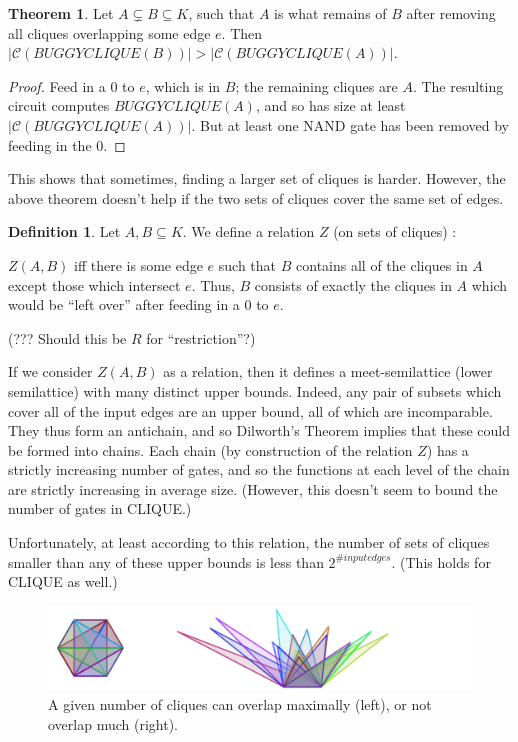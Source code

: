 \documentclass[12pt]{article}
\theoremstyle{definition}
\newtheorem{thm}{Theorem}[section]
\newtheorem{defn}{Definition}[section]
\newcommand{\bigC}[0]{\mathcal{C}}
\begin{document}
\begin{thm}
\label{edgeZonking}
Let $A \subsetneq B \subseteq K$, such that $A$ is what remains
of $B$ after removing all cliques overlapping some edge $e$.
Then $|\bigC(BUGGYCLIQUE(B))| > |\bigC(BUGGYCLIQUE(A))|$.
\end{thm}
\begin{proof}
Feed in a 0 to $e$, which is in $B$; the remaining cliques are $A$.
The resulting
circuit computes $BUGGYCLIQUE(A)$, and so has size
at least $|\bigC(BUGGYCLIQUE(A))|$. But at least one
NAND gate has been removed by feeding in the 0.
\end{proof}

This shows that sometimes, finding a larger set of cliques is
harder. However, the above theorem doesn't help if the two
sets of cliques cover the same set of edges.

\begin{defn}
\label{zRelation}
Let $A, B \subseteq K$. We define a relation $Z$ (on sets of cliques) :

$Z(A,B)$ iff there is some edge $e$ such that $B$ contains all of the
cliques in $A$ except those which intersect $e$. Thus, $B$ consists
of exactly the cliques in $A$ which would be ``left over'' after
feeding in a 0 to $e$.
\end{defn}

(??? Should this be $R$ for ``restriction''?)

If we consider $Z(A, B)$ as a relation, then it defines a meet-semilattice
(lower semilattice) with 
many distinct upper bounds.  Indeed, any pair of subsets which
cover all of the input edges are an upper bound, all of which
are incomparable. They thus form an antichain, and so Dilworth's Theorem
implies that these could be formed into chains. Each chain (by construction
of the relation $Z$) has a strictly increasing number of gates, and so the
functions at each level of the chain are strictly increasing in average
size. (However, this doesn't seem to bound the number of gates in CLIQUE.)

Unfortunately, at least according to this relation,
the number of sets of cliques smaller than
any of these upper bounds is less than $2^{\# input edges}$.
(This holds for CLIQUE as well.)

\begin{figure}
\label{overlappingTris}
\centering
\includegraphics[width=1\textwidth]{R/tri1.pdf}
\caption{A given number of cliques can overlap maximally (left),
or not overlap much (right).}
\label{fig:overlappingTriangles}
\end{figure}
\end{document}
